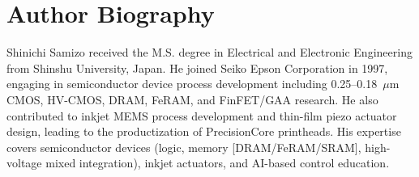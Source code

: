 \documentclass[conference]{IEEEtran}
\begin{document}
\section*{Author Biography}
Shinichi Samizo received the M.S. degree in Electrical and Electronic Engineering from Shinshu University, Japan. He joined Seiko Epson Corporation in 1997, engaging in semiconductor device process development including 0.25--0.18~$\mu$m CMOS, HV-CMOS, DRAM, FeRAM, and FinFET/GAA research. He also contributed to inkjet MEMS process development and thin-film piezo actuator design, leading to the productization of PrecisionCore printheads. His expertise covers semiconductor devices (logic, memory [DRAM/FeRAM/SRAM], high-voltage mixed integration), inkjet actuators, and AI-based control education.
\end{document}
